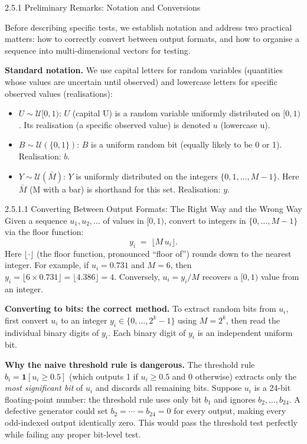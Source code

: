 \documentclass[aspectratio=169,10pt]{beamer}
\begin{document}
\begin{frame}[allowframebreaks]{2.5.1 Preliminary Remarks: Notation and Conversions}

Before describing specific tests, we establish notation and address two
practical matters: how to correctly convert between output formats, and
how to organise a sequence into multi-dimensional vectors for testing.

\medskip
\textbf{Standard notation.}  We use capital letters for random variables
(quantities whose values are uncertain until observed) and lowercase letters
for specific observed values (realisations):
\begin{itemize}
  \item $U \sim \mathcal{U}[0,1)$: $U$ (capital U) is a random variable
    uniformly distributed on $[0,1)$.  Its realisation (a specific observed
    value) is denoted $u$ (lowercase u).
  \item $B \sim \mathcal{U}(\{0,1\})$: $B$ is a uniform random bit (equally
    likely to be 0 or 1).  Realisation: $b$.
  \item $Y \sim \mathcal{U}(\bar{M})$: $Y$ is uniformly distributed on the
    integers $\{0, 1, \ldots, M-1\}$.  Here $\bar{M}$ (M with a bar) is
    shorthand for this set.  Realisation: $y$.
\end{itemize}

\begin{block}{2.5.1.1 Converting Between Output Formats: The Right Way and the Wrong Way}
Given a sequence $u_1, u_2, \ldots$ of values in $[0,1)$, convert to
integers in $\{0, \ldots, M-1\}$ via the floor function:
\[
  y_i \;=\; \lfloor M\,u_i \rfloor.
\]
Here $\lfloor \cdot \rfloor$ (the floor function, pronounced ``floor of'')
rounds down to the nearest integer.  For example, if $u_i = 0.731$ and
$M = 6$, then $y_i = \lfloor 6 \times 0.731 \rfloor = \lfloor 4.386 \rfloor = 4$.
Conversely, $u_i = y_i / M$ recovers a $[0,1)$ value from an integer.

\textbf{Converting to bits: the correct method.}
To extract random bits from $u_i$, first convert $u_i$ to an integer
$y_i \in \{0, \ldots, 2^k - 1\}$ using $M = 2^k$, then read the individual
binary digits of $y_i$.  Each binary digit of $y_i$ is an independent uniform
bit.

\textbf{Why the naive threshold rule is dangerous.}
The threshold rule $b_i = \mathbf{1}[u_i \ge 0.5]$ (which outputs 1 if
$u_i \ge 0.5$ and 0 otherwise) extracts only the \emph{most significant bit}
of $u_i$ and discards all remaining bits.  Suppose $u_i$ is a 24-bit
floating-point number: the threshold rule uses only bit $b_1$ and ignores
$b_2, \ldots, b_{24}$.  A defective generator could set $b_2 = \cdots = b_{24} = 0$
for every output, making every odd-indexed output identically zero.  This would
pass the threshold test perfectly while failing any proper bit-level test.
\end{block}


\end{frame}
\end{document}
